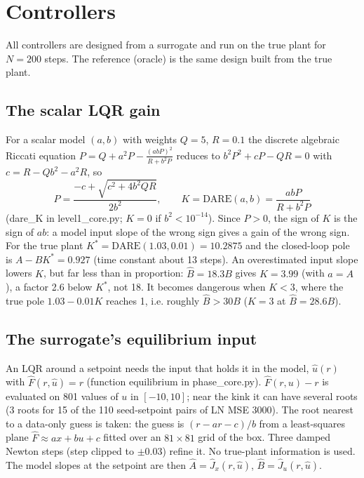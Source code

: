 \documentclass[11pt]{article}
\begin{document}
\section{Controllers}\label{sec:ctrl}

All controllers are designed from a surrogate and run on the true plant for $N=200$ steps. The reference (oracle) is the same design built from the true plant.

\subsection{The scalar LQR gain}
For a scalar model $(a,b)$ with weights $Q=5$, $R=0.1$ the discrete algebraic Riccati equation $P = Q + a^2P - \frac{(abP)^2}{R+b^2P}$ reduces to $b^2P^2 + cP - QR = 0$ with $c = R - Qb^2 - a^2R$, so
\begin{equation}
P = \frac{-c+\sqrt{c^2+4b^2QR}}{2b^2},\qquad K = \mathrm{DARE}(a,b) = \frac{abP}{R+b^2P}
\end{equation}
(dare\_K in level1\_core.py; $K=0$ if $b^2<10^{-14}$). Since $P>0$, the sign of $K$ is the sign of $ab$: a model input slope of the wrong sign gives a gain of the wrong sign. For the true plant $K^*=\mathrm{DARE}(1.03,0.01)=10.2875$ and the closed-loop pole is $A-BK^*=0.927$ (time constant about 13 steps). An overestimated input slope lowers $K$, but far less than in proportion: $\hat B=18.3B$ gives $K=3.99$ (with $a=A$), a factor 2.6 below $K^*$, not 18. It becomes dangerous when $K<3$, where the true pole $1.03-0.01K$ reaches 1, i.e. roughly $\hat B>30B$ ($K=3$ at $\hat B=28.6B$).

\subsection{The surrogate's equilibrium input}
An LQR around a setpoint needs the input that holds it in the model, $\hat u(r)$ with $\hat F(r,\hat u)=r$ (function equilibrium in phase\_core.py). $\hat F(r,u)-r$ is evaluated on 801 values of $u$ in $[-10,10]$; near the kink it can have several roots (3 roots for 15 of the 110 seed-setpoint pairs of LN MSE 3000). The root nearest to a data-only guess is taken: the guess is $(r-ar-c)/b$ from a least-squares plane $\hat F\approx ax+bu+c$ fitted over an $81\times81$ grid of the box. Three damped Newton steps (step clipped to $\pm0.03$) refine it. No true-plant information is used. The model slopes at the setpoint are then $\hat A=\hat J_x(r,\hat u)$, $\hat B=\hat J_u(r,\hat u)$.
\end{document}
